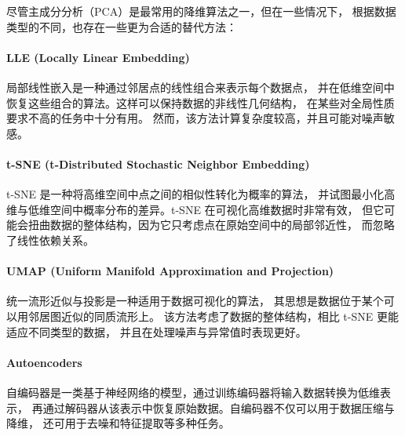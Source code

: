\begin{theorem}
尽管主成分分析（PCA）是最常用的降维算法之一，但在一些情况下，
根据数据类型的不同，也存在一些更为合适的替代方法：

\paragraph{LLE (Locally Linear Embedding)}  
局部线性嵌入是一种通过邻居点的线性组合来表示每个数据点，
并在低维空间中恢复这些组合的算法。这样可以保持数据的非线性几何结构，
在某些对全局性质要求不高的任务中十分有用。
然而，该方法计算复杂度较高，并且可能对噪声敏感。

\paragraph{t-SNE (t-Distributed Stochastic Neighbor Embedding)}  
t-SNE 是一种将高维空间中点之间的相似性转化为概率的算法，
并试图最小化高维与低维空间中概率分布的差异。t-SNE 在可视化高维数据时非常有效，
但它可能会扭曲数据的整体结构，因为它只考虑点在原始空间中的局部邻近性，
而忽略了线性依赖关系。

\paragraph{UMAP (Uniform Manifold Approximation and Projection)}  
统一流形近似与投影是一种适用于数据可视化的算法，
其思想是数据位于某个可以用邻居图近似的同质流形上。
该方法考虑了数据的整体结构，相比 t-SNE 更能适应不同类型的数据，
并且在处理噪声与异常值时表现更好。

\paragraph{Autoencoders}  
自编码器是一类基于神经网络的模型，通过训练编码器将输入数据转换为低维表示，
再通过解码器从该表示中恢复原始数据。自编码器不仅可以用于数据压缩与降维，
还可用于去噪和特征提取等多种任务。
\end{theorem}